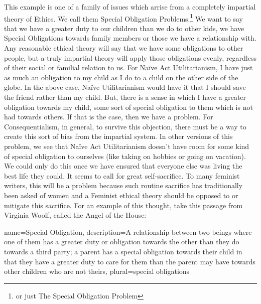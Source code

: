 This example is one of a family of issues which arrise from a completely impartial theory of Ethics. We call them Special Obligation Problems.\footnote{or just The Special Obligation Problem} We want to say that we have a greater duty to our children than we do to other kids, we have \glspl{Special Obligation} towards family members or those we have a relationship with. Any reasonable ethical theory will say that we have some obligations to other people, but a truly impartial theory will apply those obligations evenly, regardless of their social or familial relation to us. For Naïve Act Utilitarianism, I have just as much an obligation to my child as I do to a child on the other side of the globe. In the above case, Na\"ive Utilitarianism would have it that I should save the friend rather than my child. But, there is a sense in which I have a greater obligation towards my child, some sort of special obligation to them which is not had towards others. If that is the case, then we have a problem. For Consequentialism, in general, to survive this objection, there must be a way to create this sort of bias from the impartial system. In other versions of this problem, we see that Naïve Act Utilitarianism doesn't have room for some kind of special obligation to ourselves (like taking on hobbies or going on vacation). We could only do this once we have ensured that everyone else was living the best life they could. It seems to call for great self-sacrifice. To many feminist writers, this will be a problem because such routine sacrifice has traditionally been asked of women and a Feminist ethical theory should be opposed to or mitigate this sacrifice. For an example of this thought, take this passage from Virginia Woolf, called the Angel of the House:\autocite{Woolf1}


{
  name=Special Obligation,
  description={A relationship between two beings where one of them has a greater duty or obligation towards the other than they do towards a third party; a parent has a special obligation towards their child in that they have a greater duty to care for them than the parent may have towards other children who are not theirs},
  plural=special obligations
}


